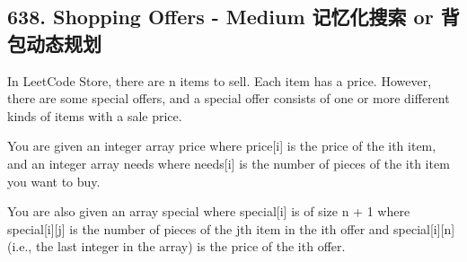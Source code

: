 \documentclass[9pt, b5paaper]{book}
\begin{document}
\subsection{638. Shopping Offers - Medium 记忆化搜索 or 背包动态规划}
\label{sec-1-0-6}
In LeetCode Store, there are n items to sell. Each item has a price. However, there are some special offers, and a special offer consists of one or more different kinds of items with a sale price.

You are given an integer array price where price[i] is the price of the ith item, and an integer array needs where needs[i] is the number of pieces of the ith item you want to buy.

You are also given an array special where special[i] is of size n + 1 where special[i][j] is the number of pieces of the jth item in the ith offer and special[i][n] (i.e., the last integer in the array) is the price of the ith offer.
\end{document}
